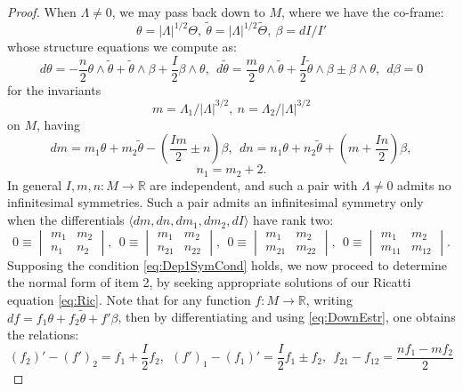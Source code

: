 \documentclass[10pt]{amsart}
\newcommand{\R}{\mathbb{R}}
\theoremstyle{definition}
\begin{document}
\begin{proof}
     When $\Lambda\ne 0$, we may pass back down to $M$, where we have the co-frame:
\[ \theta = |\Lambda|^{1/2}\Theta, ~\tilde\theta = |\Lambda|^{1/2} \tilde\Theta, ~\beta = dI/I' \]
whose structure equations we compute as:
\begin{equation}\label{eq:DownEstr}
 d\theta = - \frac{n}{2}\theta\wedge\tilde\theta + \tilde\theta\wedge\beta + \frac{I}{2} \beta\wedge\theta, ~~d\tilde\theta = \frac{m}{2} \theta\wedge\tilde\theta + \frac{I}{2}\tilde\theta\wedge\beta \pm \beta \wedge \theta,~~
d\beta = 0
\end{equation}
for the invariants
\[ m = \Lambda_1/|\Lambda|^{3/2}, ~n = \Lambda_2/|\Lambda|^{3/2} \]
on $M$, having
\[ dm = m_1\theta + m_2\tilde\theta -  \left( \frac{Im}{2} \pm n\right)\beta, ~~ dn = n_1 \theta + n_2 \tilde\theta + \left( m + \frac{In}{2} \right)\beta,  \]
\[n_1 = m_2 + 2. \]
In general $I, m,n:M\to \R$ are independent, and such a pair with $\Lambda\ne 0$ admits no infinitesimal symmetries.  Such a pair admits an infinitesimal symmetry only when the differentials $\langle dm, dn, dm_1, dm_2, dI\rangle$ have rank two:
\begin{equation}\label{eq:Dep1SymCond}
    0 \equiv \begin{vmatrix}
    m_1 & m_2 \\ n_1 & n_2
\end{vmatrix},  ~~0 \equiv \begin{vmatrix}
    m_1 & m_2 \\ n_{21} & n_{22}
\end{vmatrix}, ~~0 \equiv \begin{vmatrix}
    m_1 & m_2 \\ m_{21} & m_{22}
\end{vmatrix}, ~~0 \equiv \begin{vmatrix}
    m_1 & m_2 \\ m_{11} & m_{12}
\end{vmatrix}.
\end{equation}
Supposing the condition \eqref{eq:Dep1SymCond} holds, we now proceed to determine the normal form of item 2, by seeking appropriate solutions of our Ricatti equation \eqref{eq:Ric}. Note that for any function $f:M\to \R$, writing $df = f_1\theta + f_2\tilde\theta + f'\beta$, then by differentiating and using \eqref{eq:DownEstr}, one obtains the relations:
\begin{equation}\label{eq:Dep1SymDerivs}
    (f_2)' - (f')_2 = f_1 + \frac{I}{2} f_2, ~~ (f')_1 - (f_1)'  =  \frac{I}{2}f_1 \pm f_2 , ~~ f_{21} - f_{12} = \frac{nf_1 - mf_2}{2}

\end{equation}
\end{proof}
\end{document}
